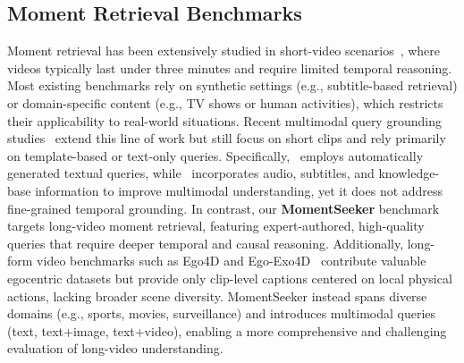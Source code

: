 \documentclass{article}
\begin{document}

\subsection{Moment Retrieval Benchmarks}

Moment retrieval has been extensively studied in short-video scenarios~\cite{qvhighlights,gao2017charadeSTA,THUMOS14,hendricks2017didemo,lei2020tvr}, where videos typically last under three minutes and require limited temporal reasoning. Most existing benchmarks rely on synthetic settings (e.g., subtitle-based retrieval) or domain-specific content (e.g., TV shows or human activities), which restricts their applicability to real-world situations.
Recent multimodal query grounding studies~\cite{ref1,ref2} extend this line of work but still focus on short clips and rely primarily on template-based or text-only queries. Specifically,~\cite{ref1} employs automatically generated textual queries, while~\cite{ref2} incorporates audio, subtitles, and knowledge-base information to improve multimodal understanding, yet it does not address fine-grained temporal grounding. In contrast, our \textbf{MomentSeeker} benchmark targets long-video moment retrieval, featuring expert-authored, high-quality queries that require deeper temporal and causal reasoning.
Additionally, long-form video benchmarks such as Ego4D and Ego-Exo4D~\cite{grauman2022ego4d,grauman2024egoexo4dunderstandingskilledhuman} contribute valuable egocentric datasets but provide only clip-level captions centered on local physical actions, lacking broader scene diversity. MomentSeeker instead spans diverse domains (e.g., sports, movies, surveillance) and introduces multimodal queries (text, text+image, text+video), enabling a more comprehensive and challenging evaluation of long-video understanding.
\end{document}
